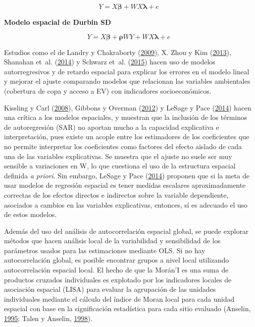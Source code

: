 \documentclass[12pt,a4paper,openany]{book}
\theoremstyle{definition}
\theoremstyle{definition}
\theoremstyle{definition}
\theoremstyle{remark}
\begin{document}
\begin{equation}
Y=X\mathbf{\beta}+WX\mathbf{\lambda}+e
\label{eq:slx}
\end{equation}

\textbf{Modelo espacial de Durbin SD}

\begin{equation}
Y=X\mathbf{\beta}+\mathbf{\rho}WY+WX\mathbf{\lambda}+e
\label{eq:sd}
\end{equation}

Estudios como el de Landry y Chakraborty
(\protect\hyperlink{ref-landry_street_2009}{2009}), X. Zhou y Kim
(\protect\hyperlink{ref-zhou_social_2013}{2013}), Shanahan et~al.
(\protect\hyperlink{ref-shanahan_socio-economic_2014}{2014}) y Schwarz
et~al. (\protect\hyperlink{ref-schwarz_trees_2015}{2015}) hacen uso de
modelos autorregresivos y de retardo espacial para explicar los errores
en el modelo lineal y mejorar el ajuste comparando modelos que
relacionan las variables ambientales (cobertura de copa y acceso a EV)
con indicadores socioeconómicos.

Kissling y Carl (\protect\hyperlink{ref-kissling_spatial_2008}{2008}),
Gibbons y Overman (\protect\hyperlink{ref-gibbons_mostly_2012}{2012}) y
LeSage y Pace (\protect\hyperlink{ref-lesage_biggest_2014}{2014}) hacen
una crítica a los modelos espaciales, y muestran que la inclusión de los
términos de autoregresión (SAR) no aportan mucho a la capacidad
explicativa e interpretación, pues existe un acople entre los
estimadores de los coeficientes que no permite interpretar los
coeficientes como factores del efecto aislado de cada una de las
variables explicativas. Se muestra que el ajuste no suele ser muy
sensible a variaciones en W, lo que cuestiona el uso de la estructura
espacial definida \emph{a priori}. Sin embargo, LeSage y Pace
(\protect\hyperlink{ref-lesage_biggest_2014}{2014}) proponen que si la
meta de usar modelos de regresión espacial es tener medidas escalares
aproximadamente correctas de los efectos directos e indirectos sobre la
variable dependiente, asociados a cambios en las variables explicativas,
entonces, sí es adecuado el uso de estos modelos.

Además del uso del análisis de autocorrelación espacial global, se puede
explorar métodos que hacen análisis local de la variabilidad y
sensibilidad de los parámetros usados para las estimaciones mediante
OLS. Si no hay autocorrelación global, es posible encontrar grupos a
nivel local utilizando autocorrelación espacial local. El hecho de que
la Morán'I es una suma de productos cruzados individuales es explotado
por los indicadores locales de asociación espacial (LISA) para evaluar
la agrupación de las unidades individuales mediante el cálculo del
índice de Moran local para cada unidad espacial con base en la
significación estadística para cada sitio evaluado (Anselin,
\protect\hyperlink{ref-anselin1995local}{1995}; Talen y Anselin,
\protect\hyperlink{ref-talen_assessing_1998}{1998}).
\end{document}
